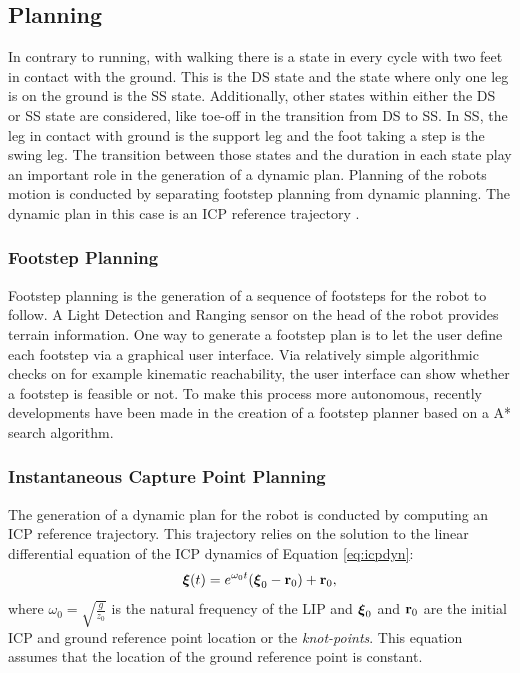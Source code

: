 \subsection{Planning}
In contrary to running, with walking there is a state in every cycle with two feet in contact with the ground. This is the \ac{DS} state and the state where only one leg is on the ground is the \ac{SS} state. Additionally, other states within either the \ac{DS} or \ac{SS} state are considered, like toe-off in the transition from \ac{DS} to \ac{SS}. In \ac{SS}, the leg in contact with ground is the support leg and the foot taking a step is the swing leg. The transition between those states and the duration in each state play an important role in the generation of a dynamic plan. Planning of the robots motion is conducted by separating footstep planning from dynamic planning. The dynamic plan in this case is an \ac{ICP} reference trajectory \cite{seyde2018inclusion}.
\subsubsection{Footstep Planning}
Footstep planning is the generation of a sequence of footsteps for the robot to follow. A Light Detection and Ranging sensor on the head of the robot provides terrain information. One way to generate a footstep plan is to let the user define each footstep via a graphical user interface. Via relatively simple algorithmic checks on for example kinematic reachability, the user interface can show whether a footstep is feasible or not. To make this process more autonomous, recently developments have been made in the creation of a footstep planner based on a A* search algorithm. 
\subsubsection{Instantaneous Capture Point Planning}\label{subsec:icpplan} 
The generation of a dynamic plan for the robot is conducted by computing an \ac{ICP} reference trajectory. This trajectory relies on the solution to the linear differential equation of the \ac{ICP} dynamics of Equation \eqref{eq:icpdyn}:
\begin{equation}\label{eq:icpsol}
	\boldsymbol{\xi}(t)=e^{\omega_0t}(\boldsymbol{\xi}_0- \mathbf{r}_0) + \mathbf{r}_0,
\end{equation}
where $\omega_0=\sqrt{\frac{g}{z_0}}$ is the natural frequency of the \ac{LIP} and $\boldsymbol{\xi}_0$ and $\mathbf{r}_0$ are the initial \ac{ICP} and ground reference point location or the \textit{knot-points}. This equation assumes that the location of the ground reference point is constant. 

